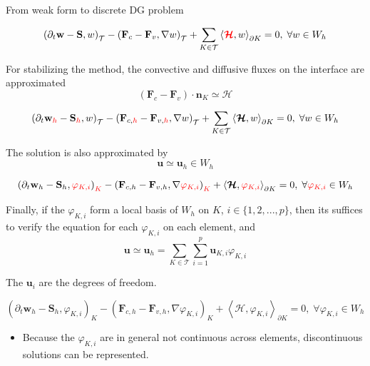 \documentclass[24pt,t,table, aspectratio=169]{beamer}
\newcommand{\vecu}{\mathbf{u}}
\newcommand{\vecF}{\mathbf{F}}
\newcommand{\vecS}{\mathbf{S}}
\newcommand{\vecw}{\mathbf{w}}
\newcommand{\vecHcal}{\boldsymbol{\mathcal{H}}}
\newcommand{\tesselation}{\mathcal{T}}
\newcommand{\vecn}{\mathbf{n}}
\begin{document}
\begin{frame}{From weak form to discrete DG problem}
{
\begin{equation*}
\left(\partial_t \vecw - \vecS, w \right)_{\tesselation} - \left(\vecF_{c} - \vecF_{v}, \nabla w \right)_{\tesselation} + \sum_{K \in \tesselation} \left\langle \textcolor{red}{\vecHcal}, w \right\rangle_{\partial K} = 0, \; \forall w \in W_h
\end{equation*}

For stabilizing the method, the convective and diffusive fluxes on the interface are approximated
\begin{equation*}
\left(\vecF_c - \vecF_v\right) \cdot \vecn_K \simeq \vecHcal 
\end{equation*}
}

{
\begin{equation*}
\left(\partial_t \vecw_{\textcolor{red}{h}} - \vecS_{\textcolor{red}{h}}, w \right)_{\tesselation} - \left(\vecF_{c, {\textcolor{red}{h}}} - \vecF_{v, {\textcolor{red}{h}}}, \nabla w \right)_{\tesselation} + \sum_{K \in \tesselation} \left\langle \vecHcal, w \right\rangle_{\partial K} = 0, \; \forall w \in W_h
\end{equation*}

The solution is also approximated by
\begin{equation*}
\vecu \simeq \vecu_h \in W_h
\end{equation*}
}

{
\begin{equation*}
\left(\partial_t \vecw_{h} - \vecS_{h}, \textcolor{red}{\varphi_{K,i}} \right)_{\textcolor{red}{K}} - \left(\vecF_{c, {h}} - \vecF_{v, {h}}, \nabla \textcolor{red}{\varphi_{K,i}} \right)_{\textcolor{red}{K}} + \left\langle \vecHcal, \textcolor{red}{\varphi_{K,i}} \right\rangle_{\partial K} = 0, \; \forall \textcolor{red}{\varphi_{K,i}} \in W_h
\end{equation*}

Finally, if the $\varphi_{K,i}$ form a local basis of $W_h$ on $K$, $i \in \{1, 2, ..., p\}$, then its suffices to verify the equation for each $\varphi_{K,i}$ on each element, and 
\begin{equation*}
\vecu \simeq \vecu_h = \sum_{K\in \tesselation}\sum_{i=1}^p \vecu_{K,i} \varphi_{K,i}
\end{equation*}

The $\vecu_i$ are the degrees of freedom.
}

{
\begin{framed}
\begin{equation*}
\left(\partial_t \vecw_{h} - \vecS_{h}, \varphi_{K,i} \right)_{K} - \left(\vecF_{c, {h}} - \vecF_{v, {h}}, \nabla \varphi_{K,i} \right)_{K} + \left\langle \vecHcal, \varphi_{K,i} \right\rangle_{\partial K} = 0, \; \forall \varphi_{K,i} \in W_h
\end{equation*}
\end{framed}
\begin{itemize}
\item Because the $\varphi_{K,i}$ are in general not continuous across elements, discontinuous solutions can be represented.


\end{itemize}}
\end{frame}
\end{document}
